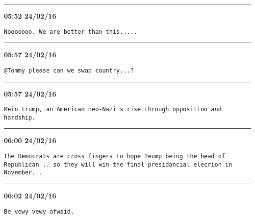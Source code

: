 \hrule%

\begin{adjustwidth}{0cm}{0cm}
\footnotesize \textbf{05:52 24/02/16}

\begin{lstlisting}[breaklines, breakatwhitespace, basicstyle=\small, frame=leftline]
Nooooooo. We are better than this.....
\end{lstlisting}
\end{adjustwidth}

\hrule%

\begin{adjustwidth}{0cm}{0cm}
\footnotesize \textbf{05:57 24/02/16}

\begin{lstlisting}[breaklines, breakatwhitespace, basicstyle=\small, frame=leftline]
@Tommy please can we swap country...?
\end{lstlisting}
\end{adjustwidth}

\hrule%

\begin{adjustwidth}{0cm}{0cm}
\footnotesize \textbf{05:57 24/02/16}

\begin{lstlisting}[breaklines, breakatwhitespace, basicstyle=\small, frame=leftline]
Mein trump, an American neo-Nazi's rise through opposition and hardship.
\end{lstlisting}
\end{adjustwidth}

\hrule%

\begin{adjustwidth}{0cm}{0cm}
\footnotesize \textbf{06:00 24/02/16}

\begin{lstlisting}[breaklines, breakatwhitespace, basicstyle=\small, frame=leftline]
The Democrats are cross fingers to hope Teump being the head of Republican .. so they will win the final presidancial elecrion in November. .
\end{lstlisting}
\end{adjustwidth}

\hrule%

\begin{adjustwidth}{0cm}{0cm}
\footnotesize \textbf{06:02 24/02/16}

\begin{lstlisting}[breaklines, breakatwhitespace, basicstyle=\small, frame=leftline]
Be vewy vewy afwaid.
\end{lstlisting}
\end{adjustwidth}

